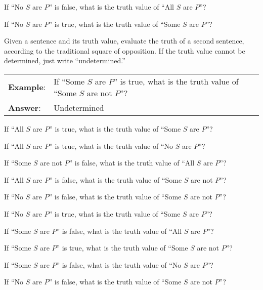 \begin{exercises}
\item If ``No $S$ are $P$'' is false, what is the truth value of ``All $S$ are $P$''? 

\item If ``No $S$ are $P$'' is true, what is the truth value of ``Some $S$ are $P$''? 

\end{exercises}

\noindent \problempart Given a sentence and its truth value, evaluate the truth of a second sentence, according to the traditional square of opposition. If the truth value cannot be determined, just write ``undetermined.''

\begin{longtabu}{p{.1\linewidth}p{.9\linewidth}}
\textbf{Example}: & If ``Some $S$ are $P$'' is true, what is the truth value of ``Some $S$ are not $P$''?\\
\textbf{Answer}: & Undetermined\\
\end{longtabu}

\begin{exercises}
\item If ``All $S$ are $P$'' is true, what is the truth value of ``Some $S$ are $P$''? %
\item If ``All $S$ are $P$'' is true, what is the truth value of ``No $S$ are $P$''? %
\item If ``Some $S$ are not $P$'' is false, what is the truth value of ``All $S$ are $P$''? %
\item If ``All $S$ are $P$'' is false, what is the truth value of ``Some $S$ are not $P$''?  %
\item If ``No $S$ are $P$'' is false, what is the truth value of ``Some $S$ are not $P$''? %
\item If ``No $S$ are $P$'' is true, what is the truth value of ``Some $S$ are $P$''? %
\item If ``Some $S$ are $P$'' is false, what is the truth value of ``All $S$ are $P$''? %
\item If ``Some $S$ are $P$'' is true, what is the truth value of ``Some $S$ are not $P$''? %
\item If ``Some $S$ are $P$'' is false, what is the truth value of ``No $S$ are $P$''? %
\item If ``No $S$ are $P$'' is false, what is the truth value of ``Some $S$ are not $P$''? %
\end{exercises}


